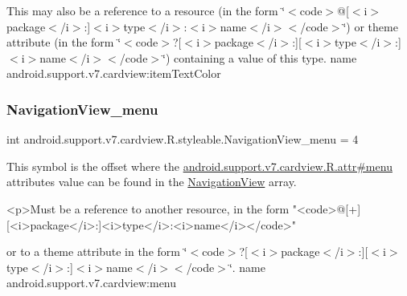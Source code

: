 This may also be a reference to a resource (in the form \char`\"{}$<$code$>$@\mbox{[}$<$i$>$package$<$/i$>$\+:\mbox{]}$<$i$>$type$<$/i$>$\+:$<$i$>$name$<$/i$>$$<$/code$>$\char`\"{}) or theme attribute (in the form \char`\"{}$<$code$>$?\mbox{[}$<$i$>$package$<$/i$>$\+:\mbox{]}\mbox{[}$<$i$>$type$<$/i$>$\+:\mbox{]}$<$i$>$name$<$/i$>$$<$/code$>$\char`\"{}) containing a value of this type.  name android.\+support.\+v7.\+cardview\+:item\+Text\+Color \mbox{\label{classandroid_1_1support_1_1v7_1_1cardview_1_1R_1_1styleable_a5d5f278f7a0e8a1f7781f0c252b6cf06}} 
\subsubsection{\texorpdfstring{Navigation\+View\+\_\+menu}{NavigationView\_menu}}
{\footnotesize\ttfamily int android.\+support.\+v7.\+cardview.\+R.\+styleable.\+Navigation\+View\+\_\+menu = 4\hspace{0.3cm}{\ttfamily [static]}}

This symbol is the offset where the \hyperlink{classandroid_1_1support_1_1v7_1_1cardview_1_1R_1_1attr_afc99d2d0e0fecb1c2703d65bd4e1ec0c}{android.\+support.\+v7.\+cardview.\+R.\+attr\#menu} attribute\textquotesingle{}s value can be found in the \hyperlink{classandroid_1_1support_1_1v7_1_1cardview_1_1R_1_1styleable_aab4216e563b2e19093e1d57494734202}{Navigation\+View} array.

\begin{DoxyVerb}      <p>Must be a reference to another resource, in the form "<code>@[+][<i>package</i>:]<i>type</i>:<i>name</i></code>"
\end{DoxyVerb}
 or to a theme attribute in the form \char`\"{}$<$code$>$?\mbox{[}$<$i$>$package$<$/i$>$\+:\mbox{]}\mbox{[}$<$i$>$type$<$/i$>$\+:\mbox{]}$<$i$>$name$<$/i$>$$<$/code$>$\char`\"{}.  name android.\+support.\+v7.\+cardview\+:menu \mbox{\label{classandroid_1_1support_1_1v7_1_1cardview_1_1R_1_1styleable_a516f08a3eae6bcc7fe5755c9605d8bc7}} 
